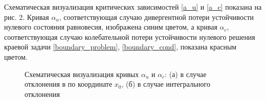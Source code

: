 \documentclass[12pt]{extarticle}
\begin{document}
\newpage

Схематическая визуализация критических зависимостей \eqref{a_u} и \eqref{a_c} показана на рис. 2. Кривая $ \alpha_u $, соответствующая случаю дивергентной потери устойчивости нулевого состояния равновесия, изображена синим цветом, а кривая $ \alpha_c $, соответствующая случаю колебательной потери устойчивости нулевого решения краевой задачи \eqref{boundary_problem}, \eqref{boundary_cond}, показана красным цветом.

\begin{figure}[h]
\begin{minipage}[h]{0.2\linewidth}
\end{minipage}
\hspace{5cm}
\begin{minipage}[h]{0.2\linewidth}
\vspace{-0.2cm}
\end{minipage}
\caption{ Схематическая визуализация кривых $ \alpha_u $ и $ \alpha_c $: (а) в случае отклонения в по координате $ x_0 $, (б) в случае интегрального отклонения }
\end{figure}
\end{document}
